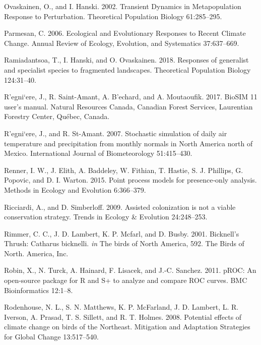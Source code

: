 \documentclass[12pt]{article}
\newlength{\cslhangindent}
\newenvironment{cslreferences}%
  {\setlength{\parindent}{0pt}%
  \everypar{\setlength{\hangindent}{\cslhangindent}}\ignorespaces}%
  {\par}
\begin{document}
\begin{cslreferences}
\leavevmode\hypertarget{ref-ovaskainen_transient_2002}{}%
Ovaskainen, O., and I. Hanski. 2002. Transient Dynamics in
Metapopulation Response to Perturbation. Theoretical Population Biology
61:285--295.

\leavevmode\hypertarget{ref-parmesan_ecological_2006}{}%
Parmesan, C. 2006. Ecological and Evolutionary Responses to Recent
Climate Change. Annual Review of Ecology, Evolution, and Systematics
37:637--669.

\leavevmode\hypertarget{ref-ramiadantsoa_responses_2018}{}%
Ramiadantsoa, T., I. Hanski, and O. Ovaskainen. 2018. Responses of
generalist and specialist species to fragmented landscapes. Theoretical
Population Biology 124:31--40.

\leavevmode\hypertarget{ref-regniere_biosim_2017}{}%
R\a'egni\a`ere, J., R. Saint-Amant, A. B\a'echard, and A. Moutaoufik.
2017. BioSIM 11 user's manual. Natural Resources Canada, Canadian Forest
Services, Laurentian Forestry Center, Québec, Canada.

\leavevmode\hypertarget{ref-regniere_stochastic_2007}{}%
R\a'egni\a`ere, J., and R. St-Amant. 2007. Stochastic simulation of
daily air temperature and precipitation from monthly normals in North
America north of Mexico. International Journal of Biometeorology
51:415--430.

\leavevmode\hypertarget{ref-renner_point_2015}{}%
Renner, I. W., J. Elith, A. Baddeley, W. Fithian, T. Hastie, S. J.
Phillips, G. Popovic, and D. I. Warton. 2015. Point process models for
presence‐only analysis. Methods in Ecology and Evolution 6:366--379.

\leavevmode\hypertarget{ref-ricciardi_assisted_2009}{}%
Ricciardi, A., and D. Simberloff. 2009. Assisted colonization is not a
viable conservation strategy. Trends in Ecology \& Evolution
24:248--253.

\leavevmode\hypertarget{ref-rimmer_bicknells_2001}{}%
Rimmer, C. C., J. D. Lambert, K. P. Mcfarl, and D. Busby. 2001.
Bicknell's Thrush: Catharus bicknelli. \emph{in} The birds of North
America, 592. The Birds of North. America, Inc.

\leavevmode\hypertarget{ref-robin_proc_2011}{}%
Robin, X., N. Turck, A. Hainard, F. Lisacek, and J.-C. Sanchez. 2011.
pROC: An open-source package for R and S+ to analyze and compare ROC
curves. BMC Bioinformatics 12:1--8.

\leavevmode\hypertarget{ref-rodenhouse_potential_2008}{}%
Rodenhouse, N. L., S. N. Matthews, K. P. McFarland, J. D. Lambert, L. R.
Iverson, A. Prasad, T. S. Sillett, and R. T. Holmes. 2008. Potential
effects of climate change on birds of the Northeast. Mitigation and
Adaptation Strategies for Global Change 13:517--540.


\end{cslreferences}
\end{document}
